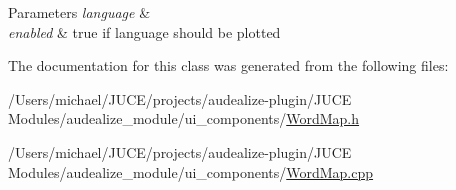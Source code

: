 \begin{DoxyParams}{Parameters}
{\em language} & \\
\hline
{\em enabled} & true if language should be plotted \\
\hline
\end{DoxyParams}


The documentation for this class was generated from the following files\+:\begin{DoxyCompactItemize}
\item 
/\+Users/michael/\+J\+U\+C\+E/projects/audealize-\/plugin/\+J\+U\+C\+E Modules/audealize\+\_\+module/ui\+\_\+components/\hyperlink{_word_map_8h}{Word\+Map.\+h}\item 
/\+Users/michael/\+J\+U\+C\+E/projects/audealize-\/plugin/\+J\+U\+C\+E Modules/audealize\+\_\+module/ui\+\_\+components/\hyperlink{_word_map_8cpp}{Word\+Map.\+cpp}\end{DoxyCompactItemize}
